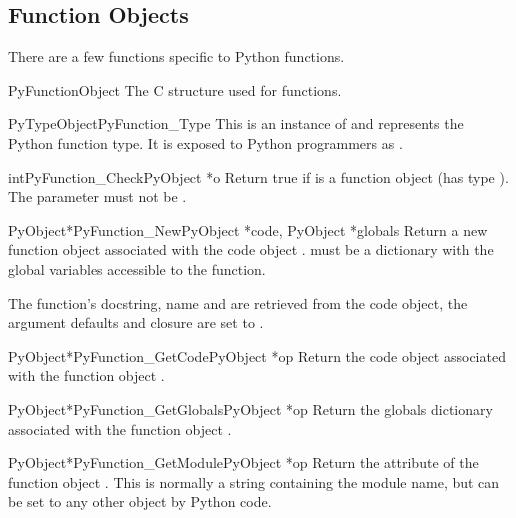 \subsection{Function Objects \label{function-objects}}

There are a few functions specific to Python functions.

\begin{ctypedesc}{PyFunctionObject}
  The C structure used for functions.
\end{ctypedesc}

\begin{cvardesc}{PyTypeObject}{PyFunction_Type}
  This is an instance of  and represents the
  Python function type.  It is exposed to Python programmers as
  .
\end{cvardesc}

\begin{cfuncdesc}{int}{PyFunction_Check}{PyObject *o}
  Return true if  is a function object (has type
  ).  The parameter must not be \NULL{}.
\end{cfuncdesc}

\begin{cfuncdesc}{PyObject*}{PyFunction_New}{PyObject *code,
                                             PyObject *globals}
  Return a new function object associated with the code object
  .  must be a dictionary with the global
  variables accessible to the function.

  The function's docstring, name and  are retrieved
  from the code object, the argument defaults and closure are set to
  \NULL{}.
\end{cfuncdesc}

\begin{cfuncdesc}{PyObject*}{PyFunction_GetCode}{PyObject *op}
  Return the code object associated with the function object .
\end{cfuncdesc}

\begin{cfuncdesc}{PyObject*}{PyFunction_GetGlobals}{PyObject *op}
  Return the globals dictionary associated with the function object
  .
\end{cfuncdesc}

\begin{cfuncdesc}{PyObject*}{PyFunction_GetModule}{PyObject *op}
  Return the  attribute of the function object .
  This is normally a string containing the module name, but can be set
  to any other object by Python code.
\end{cfuncdesc}

